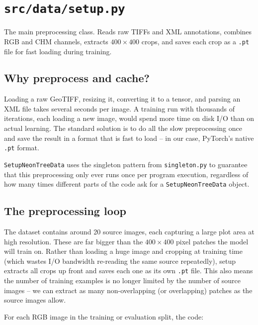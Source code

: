\documentclass[11pt, a4paper]{article}
\newenvironment{filebox}[1]{%
  \begin{tcolorbox}[
    colback=filebg, colframe=fileframe,
    fonttitle=\bfseries\ttfamily, title=#1,
    breakable, enhanced
  ]
}{%
  \end{tcolorbox}
}
\begin{document}
\section{\texttt{src/data/setup.py}}
\label{sec:setup}

\begin{filebox}{src/data/setup.py}
  The main preprocessing class. Reads raw TIFFs and XML annotations, combines
  RGB and CHM channels, extracts $400 \times 400$ crops, and saves each crop
  as a \texttt{.pt} file for fast loading during training.
\end{filebox}

\subsection{Why preprocess and cache?}

Loading a raw GeoTIFF, resizing it, converting it to a tensor, and parsing an
XML file takes several seconds per image. A training run with thousands of
iterations, each loading a new image, would spend more time on disk I/O than
on actual learning. The standard solution is to do all the slow preprocessing
once and save the result in a format that is fast to load -- in our case,
PyTorch's native \texttt{.pt} format.

\texttt{SetupNeonTreeData} uses the singleton pattern from
\texttt{singleton.py} to guarantee that this preprocessing only ever runs once
per program execution, regardless of how many times different parts of the code
ask for a \texttt{SetupNeonTreeData} object.

\subsection{The preprocessing loop}

The dataset contains around 20 source images, each capturing a large plot area
at high resolution. These are far bigger than the $400 \times 400$ pixel
patches the model will train on. Rather than loading a huge image and cropping
at training time (which wastes I/O bandwidth re-reading the same source
repeatedly), setup extracts all crops up front and saves each one as its own
\texttt{.pt} file. This also means the number of training examples is no
longer limited by the number of source images -- we can extract as many
non-overlapping (or overlapping) patches as the source images allow.

For each RGB image in the training or evaluation split, the code:
\end{document}
